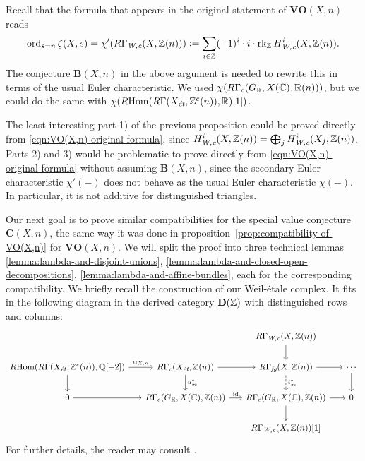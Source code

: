 \documentclass{article}
\numberwithin{equation}{section}
\begin{document}
\begin{remark}
  Recall that the formula that appears in the original statement of
  $\mathbf{VO} (X,n)$ reads
  \begin{equation}
    \label{eqn:VO(X,n)-original-formula}
    \ord_{s=n} \zeta (X,s) = \chi' (R\Gamma_\Wc (X,\ZZ(n))) \dfn
    \sum_{i\in \ZZ} (-1)^i\cdot i \cdot \rk_\ZZ H^i_\Wc (X,\ZZ(n)).
  \end{equation}
  The conjecture $\mathbf{B} (X,n)$ in the above argument is needed to rewrite
  this in terms of the usual Euler characteristic. We used
  $\chi (R\Gamma_c (G_\RR, X (\CC), \RR (n)))$, but we could do the same with
  $\chi (\RHom (R\Gamma (X_\et, \ZZ^c (n)), \RR) [1])$.

  The least interesting part 1) of the previous proposition could be proved
  directly from \eqref{eqn:VO(X,n)-original-formula}, since
  $H^i_\Wc (X,\ZZ(n)) = \bigoplus_j H^i_\Wc (X_j,\ZZ(n))$. Parts 2) and 3) would
  be problematic to prove directly from \eqref{eqn:VO(X,n)-original-formula}
  without assuming $\mathbf{B} (X,n)$, since the secondary Euler characteristic
  $\chi' (-)$ does not behave as the usual Euler characteristic $\chi (-)$.
  In particular, it is not additive for distinguished triangles.
\end{remark}

Our next goal is to prove similar compatibilities for the special value
conjecture $\mathbf{C} (X,n)$, the same way it was done in
proposition~\ref{prop:compatibility-of-VO(X,n)} for $\mathbf{VO} (X,n)$.
We will split the proof into three technical lemmas
\ref{lemma:lambda-and-disjoint-unions},
\ref{lemma:lambda-and-closed-open-decompositions},
\ref{lemma:lambda-and-affine-bundles},
each for the corresponding compatibility. We briefly recall the construction of
our Weil-étale complex. It fits in the following diagram in the derived
category $\mathbf{D} (\ZZ)$ with distinguished rows and columns:
\[ \begin{tikzcd}[column sep=1.5em]
    & & R\Gamma_\Wc (X, \ZZ (n)) \ar{d} \\
    \RHom (R\Gamma (X_\et, \ZZ^c (n)), \QQ [-2]) \ar{r}{\alpha_{X,n}}\ar{d} & R\Gamma_c (X_\et, \ZZ (n)) \ar{r}\ar{d}{u_\infty^*} & R\Gamma_\fg (X, \ZZ(n)) \ar{r}\ar[dashed]{d}{i_\infty^*} & \cdots \ar{d} \\
    0 \ar{r} & R\Gamma_c (G_\RR, X (\CC), \ZZ(n)) \ar{r}{\mathrm{id}} & R\Gamma_c (G_\RR, X (\CC), \ZZ(n)) \ar{r}\ar{d} & 0 \\
    & & R\Gamma_\Wc (X, \ZZ (n)) [1]
  \end{tikzcd} \]
For further details, the reader may consult \cite{Beshenov-Weil-etale-1}.
\end{document}
